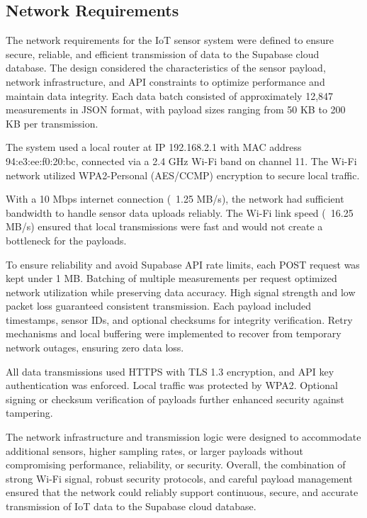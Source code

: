 {	\subsection{Network Requirements}
	{
		The network requirements for the IoT sensor system were defined to ensure secure, reliable, and efficient transmission of data to the Supabase cloud database. The design considered the characteristics of the sensor payload, network infrastructure, and API constraints to optimize performance and maintain data integrity. Each data batch consisted of approximately 12,847 measurements in JSON format, with payload sizes ranging from 50 KB to 200 KB per transmission.
		
		The system used a local router at IP 192.168.2.1 with MAC address 94:e3:ee:f0:20:bc, connected via a 2.4 GHz Wi-Fi band on channel 11. The Wi-Fi network utilized WPA2-Personal (AES/CCMP) encryption to secure local traffic.
		
		With a 10 Mbps internet connection (~1.25 MB/s), the network had sufficient bandwidth to handle sensor data uploads reliably. The Wi-Fi link speed (~16.25 MB/s) ensured that local transmissions were fast and would not create a bottleneck for the payloads. 
		
		To ensure reliability and avoid Supabase API rate limits, each POST request was kept under 1 MB. Batching of multiple measurements per request optimized network utilization while preserving data accuracy. High signal strength and low packet loss guaranteed consistent transmission. Each payload included timestamps, sensor IDs, and optional checksums for integrity verification. Retry mechanisms and local buffering were implemented to recover from temporary network outages, ensuring zero data loss.
		
		All data transmissions used HTTPS with TLS 1.3 encryption, and API key authentication was enforced. Local traffic was protected by WPA2. Optional signing or checksum verification of payloads further enhanced security against tampering.
		
		The network infrastructure and transmission logic were designed to accommodate additional sensors, higher sampling rates, or larger payloads without compromising performance, reliability, or security. Overall, the combination of strong Wi-Fi signal, robust security protocols, and careful payload management ensured that the network could reliably support continuous, secure, and accurate transmission of IoT data to the Supabase cloud database.
	}
}

